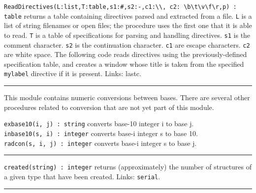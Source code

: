 \texttt{ReadDirectives(L:list,T:table,s1:{\textquotedbl}\#{\textquotedbl},s2:{\textquotedbl}-{\textquotedbl},c1:{\textquotesingle}{\textbackslash}{\textbackslash}{\textquotesingle},
c2:{\textquotesingle}
{\textbackslash}b{\textbackslash}t{\textbackslash}v{\textbackslash}f{\textbackslash}r{\textquotesingle},p)
: table} returns a table containing directives parsed and extracted
from a file. \texttt{L} is a list of string filenames or open files;
the procedure uses the first one that it is able to read. \texttt{T} is
a table of specifications for parsing and handling directives.
\texttt{s1} is the comment character. \texttt{s2} is the continuation
character. \texttt{c1} are escape characters. \texttt{c2} are white
space. The following code reads directives using the previously-defined
specification table, and creates a window whose title is taken from the
specified \texttt{mylabel} directive if it is present. Links: lastc.




\vspace{0.25cm}\hrule{}

This module contains numeric conversions between
bases. There are several other procedures related
to conversion that are not yet part of this module. 

\texttt{exbase10(i, j) : string} converts base-10 integer i to base
j.\\
\texttt{inbase10(s, i) : integer} converts base-i integer s to base
10.\\
\texttt{radcon(s, i, j) : integer} converts base-i integer s to base j.

\vspace{0.25cm}\hrule{}

\texttt{created(string) : integer} returns (approximately) the number of
structures of a given type that have been created. Links: \texttt{serial}. 

\vspace{0.25cm}\hrule{}


